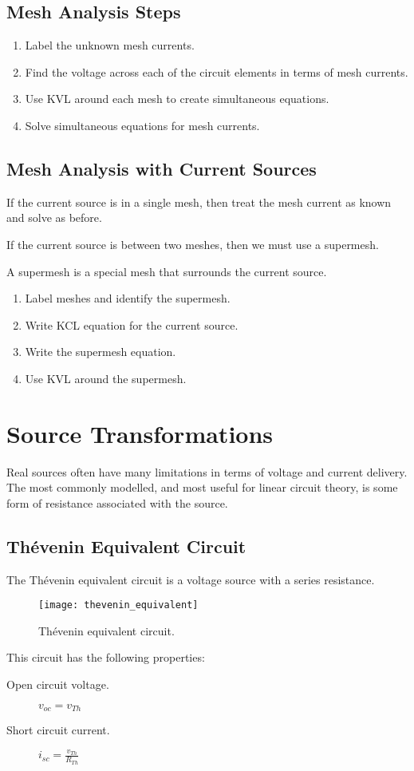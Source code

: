 \documentclass{article}
\begin{document}
\subsection{Mesh Analysis Steps}
\begin{enumerate}
    \item Label the unknown mesh currents.
    \item Find the voltage across each of the circuit elements in terms of mesh currents.
    \item Use KVL around each mesh to create simultaneous equations.
    \item Solve simultaneous equations for mesh currents.
\end{enumerate}
\subsection{Mesh Analysis with Current Sources}
If the current source is in a single mesh, then treat the mesh current as known and solve as before.

If the current source is between two meshes, then we must use a supermesh.
\begin{definition}[Supermesh]
    A supermesh is a special mesh that surrounds the current source.
\end{definition}
\begin{enumerate}
    \item Label meshes and identify the supermesh.
    \item Write KCL equation for the current source.
    \item Write the supermesh equation.
    \item Use KVL around the supermesh.
\end{enumerate}
\newpage
\section{Source Transformations}
Real sources often have many limitations in terms of voltage and current delivery.
The most commonly modelled, and most useful for linear circuit theory, is some form of
resistance associated with the source.
\subsection{Thévenin Equivalent Circuit}
\begin{definition}
    The Thévenin equivalent circuit is a voltage source with a series resistance.
    \begin{figure}[H]
        \centering
        \texttt{[image: thevenin\_equivalent]}
        \caption{Thévenin equivalent circuit.}
    \end{figure}
    This circuit has the following properties:
    \begin{description}
        \item[Open circuit voltage.] $v_{oc} = v_{Th}$
        \item[Short circuit current.] $i_{sc} = \frac{v_{Th}}{R_{Th}}$
    \end{description}
\end{definition}
\end{document}
